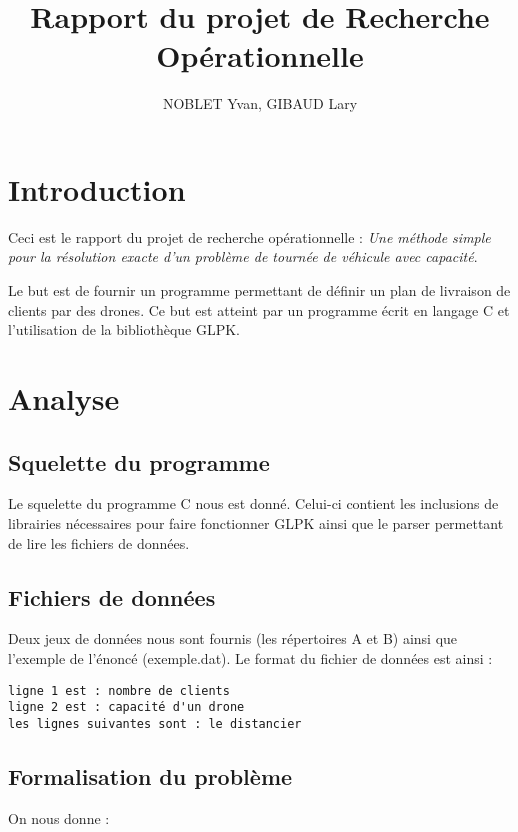 \documentclass[a4paper,10pt]{article}
\title{Rapport du projet de Recherche Opérationnelle}
\author{NOBLET Yvan, GIBAUD Lary}
\begin{document}
\renewcommand{\labelitemi}{$\bullet$}


\date{}
\maketitle
\tableofcontents
\section{Introduction}

Ceci est le rapport du projet de recherche opérationnelle : 
\emph{Une méthode simple pour la résolution exacte d’un problème
 de tournée de véhicule avec capacité}.

Le but est de fournir un programme permettant de définir un plan de livraison de clients par des drones. 
Ce but est atteint par un programme écrit en langage C et l'utilisation de la bibliothèque GLPK.

\section{Analyse}

\subsection{Squelette du programme}

Le squelette du programme C nous est donné. Celui-ci contient les inclusions de librairies nécessaires pour faire fonctionner GLPK ainsi que le parser permettant de lire les fichiers de données.

\subsection{Fichiers de données}

Deux jeux de données nous sont fournis (les répertoires A et B) ainsi que l'exemple de l'énoncé (exemple.dat). Le format du fichier de données est ainsi :
\begin{verbatim}
ligne 1 est : nombre de clients
ligne 2 est : capacité d'un drone
les lignes suivantes sont : le distancier
\end{verbatim}

\subsection{Formalisation du problème}

On nous donne :
\end{document}
